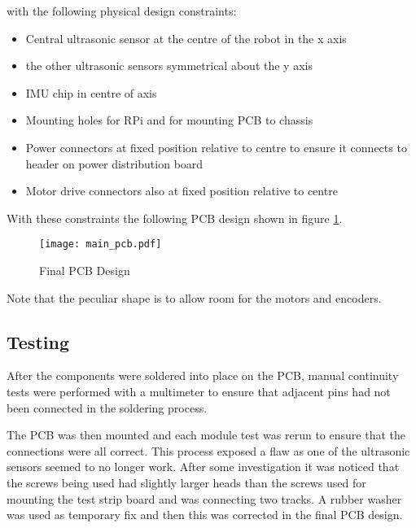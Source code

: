 with the following physical design constraints:

\begin{itemize}
  \item Central ultrasonic sensor at the centre of the robot in the x axis
  \item the other ultrasonic sensors symmetrical about the y axis
  \item IMU chip in centre of axis
  \item Mounting holes for RPi and for mounting PCB to chassis
  \item Power connectors at fixed position relative to centre to ensure it connects to header on power distribution board
  \item Motor drive connectors also at fixed position relative to centre 
\end{itemize}



With these constraints the following PCB design shown in figure \ref{PCB_Design}.

\begin{figure}[!ht]
	\centering
	\texttt{[image: main\_pcb.pdf]}
	\caption{Final PCB Design}\label{PCB_Design}

\end{figure}
Note that the peculiar shape is to allow room for the motors and encoders. 

\subsection{Testing}\label{elec/pcb/test}

After the components were soldered into place on the PCB, manual continuity tests were performed with a multimeter to ensure that adjacent pins had not been connected in the soldering process.

The PCB was then mounted and each module test was rerun to ensure that the connections were all correct. This process exposed a flaw as one of the ultrasonic sensors seemed to no longer work. After some investigation it was noticed that the screws being used had slightly larger heads than the screws used for mounting the test strip board and was connecting two tracks. A rubber washer was used as temporary fix and then this was corrected in the final PCB design. 
